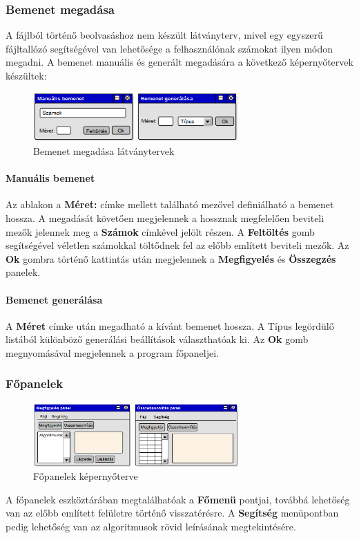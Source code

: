 \documentclass{elteikthesis}
\begin{document}
\subsubsection{Bemenet megadása}
A fájlból történő beolvasáshoz nem készült látványterv, mivel egy egyszerű fájltallózó segítségével van lehetősége a felhasználónak számokat ilyen módon megadni. A bemenet manuális és generált megadására a következő képernyőtervek készültek:
\begin{figure}[H]
	\centering
	\includegraphics[width=0.7\textwidth]{pics/plan_input.png}
	\caption{Bemenet megadása látványtervek}
\end{figure}\par
\paragraph{Manuális bemenet}
Az ablakon a \textbf{Méret:} címke mellett található mezővel definiálható a bemenet hossza. A megadását követően megjelennek a hossznak megfelelően beviteli mezők jelennek meg a \textbf{Számok} címkével jelölt részen. A \textbf{Feltöltés} gomb segítségével véletlen számokkal töltődnek fel az előbb említett beviteli mezők. Az \textbf{Ok} gombra történő kattintás után megjelennek a \textbf{Megfigyelés} és \textbf{Összegzés} panelek.
\paragraph{Bemenet generálása}
A \textbf{Méret} címke után megadható a kívánt bemenet hossza. A Típus legördülő listából különböző generálási beállítások választhatóak ki. Az \textbf{Ok} gomb megnyomásával megjelennek a program főpaneljei.
\subsubsection{Főpanelek}
\begin{figure}[H]
	\centering
	\includegraphics[width=0.7\textwidth]{pics/plan_panels.png}
	\caption{Főpanelek képernyőterve}
\end{figure}\par
A főpanelek eszköztárában megtalálhatóak a \textbf{Főmenü} pontjai, továbbá lehetőség van az előbb említett felületre történő visszatérésre. A \textbf{Segítség} menüpontban pedig lehetőség van az algoritmusok rövid leírásának megtekintésére.
\end{document}
